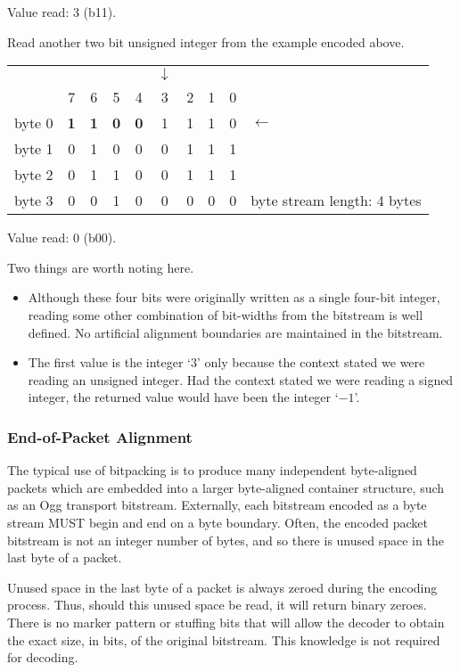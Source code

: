 \documentclass[11pt,letterpaper]{article}
\begin{document}
Value read: 3 (b11).

Read another two bit unsigned integer from the example encoded above.

\begin{tabular}{r|ccccccccl}
\multicolumn{1}{r}{} &&&&&$\downarrow$&&&&              \\
         & 7 & 6 & 5 & 4 & 3 & 2 & 1 & 0 &              \\\cline{1-9}
byte 0   & \textbf{1} & \textbf{1} & \textbf{0} & \textbf{0} &
                           1 & 1 & 1 & 0 & $\leftarrow$ \\
byte 1   & 0 & 1 & 0 & 0 & 0 & 1 & 1 & 1 &              \\
byte 2   & 0 & 1 & 1 & 0 & 0 & 1 & 1 & 1 &              \\
byte 3   & 0 & 0 & 1 & 0 & 0 & 0 & 0 & 0 &
byte stream length: 4 bytes
\end{tabular}
\vspace{\baselineskip}

Value read: 0 (b00).

Two things are worth noting here.
\begin{itemize}
\item
Although these four bits were originally written as a single four-bit integer,
 reading some other combination of bit-widths from the bitstream is well
 defined.
No artificial alignment boundaries are maintained in the bitstream.
\item
The first value is the integer `$3$' only because the context stated we were
 reading an unsigned integer.
Had the context stated we were reading a signed integer, the returned value
 would have been the integer `$-1$'.
\end{itemize}

\subsubsection{End-of-Packet Alignment}

The typical use of bitpacking is to produce many independent byte-aligned
 packets which are embedded into a larger byte-aligned container structure,
 such as an Ogg transport bitstream.
Externally, each bitstream encoded as a byte stream MUST begin and end on a
 byte boundary.
Often, the encoded packet bitstream is not an integer number of bytes, and so
 there is unused space in the last byte of a packet.

Unused space in the last byte of a packet is always zeroed during the encoding
 process.
Thus, should this unused space be read, it will return binary zeroes.
There is no marker pattern or stuffing bits that will allow the decoder to
 obtain the exact size, in bits, of the original bitstream.
This knowledge is not required for decoding.
\end{document}
